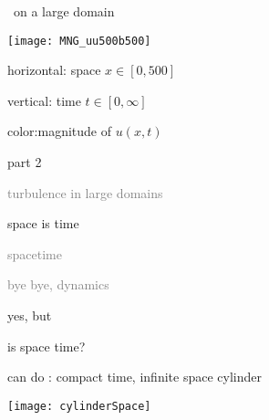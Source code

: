 \begin{frame}{\KS\ on a large domain}
\begin{center}
  \texttt{[image: MNG\_uu500b500]}
\end{center}

\vfill

{\footnotesize
horizontal: space $x \in [0,500]$

vertical: \quad time \quad $t \in [0,\infty]$

color:\qquad  magnitude of $u(x,t)$
}
\end{frame}

\begin{frame}{part 2}
\begin{enumerate}
              \item
    \textcolor{gray}{\small
turbulence in large domains
        }
              \item
    {\Large
space is time
    }\textcolor{gray}{\small
              \item
spacetime
              \item
bye bye, dynamics
                    }
            \end{enumerate}
\end{frame}

\begin{frame}{yes, but}
\begin{center}
{\huge is space time?}
\end{center}
\end{frame}

\begin{frame}{can do : compact time, infinite space cylinder}
\begin{center}
\texttt{[image: cylinderSpace]}
\end{center}
\end{frame}

